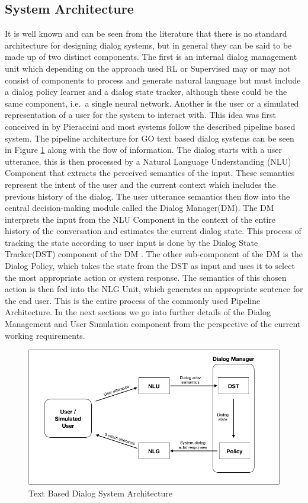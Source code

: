 \documentclass[14pt]{extarticle}
\numberwithin{equation}{section}
\begin{document}
	\subsection{System Architecture}\label{subsec:sys-arch}
	It is well known and can be seen from the literature \cite{ds_survey} that there is no standard architecture for designing dialog systems, but in general they can be said to be made up of two distinct components. The first is an internal dialog management unit which depending on the approach used RL or Supervised may or may not consist of components to process and generate natural language but must include a dialog policy learner and a dialog state tracker, although these could be the same component, i.e.\ a single neural network. Another is the user or a simulated representation of a user for the system to interact with. This idea was first conceived in by Pieraccini \cite{Pieraccini2006WhereDW} and most systems follow the described pipeline based system. The pipeline architecture for GO text based dialog systems can be seen in Figure \ref{sys-arch1} along with the flow of information. The dialog starts with a user utterance, this is then processed by a Natural Language Understanding (NLU) Component that extracts the perceived semantics of the input. These semantics represent the intent of the user and the current context which includes the previous history of the dialog. The user utterance semantics then flow into the central decision-making module called the Dialog Manager(DM). The DM interprets the input from the NLU Component in the context of the entire history of the conversation and estimates the current dialog state. This process of tracking the state according to user input is done by the Dialog State Tracker(DST) component of the DM \cite{ml_dst_review}. The other sub-component of the DM is the Dialog Policy, which takes the state from the DST as input and uses it to select the most appropriate action or system response. The semantics of this chosen action is then fed into the NLG Unit, which generates an appropriate sentence for the end user. This is the entire process of the commonly used Pipeline Architecture.
	In the next sections we go into further details of the Dialog Management and User Simulation component from the perspective of the current working requirements.
		\begin{figure}[H]
		\includegraphics[scale=0.55]{sys-arch1}
		\centering
		\caption{Text Based Dialog System Architecture
			\label{sys-arch1}}
	\end{figure}
\end{document}
